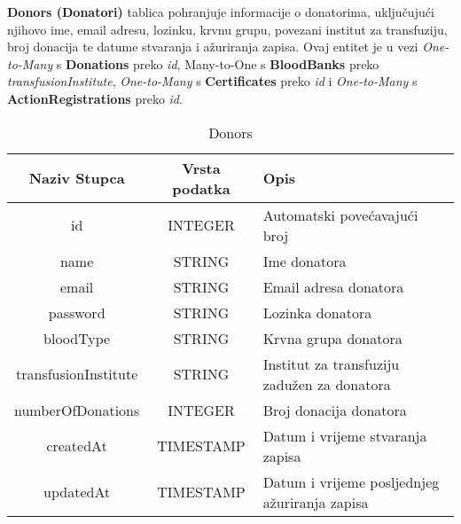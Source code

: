 				\noindent\textbf{Donors (Donatori)} tablica pohranjuje informacije o donatorima, uključujući njihovo ime, email adresu, lozinku, krvnu grupu, povezani institut za transfuziju, broj donacija te datume stvaranja i ažuriranja zapisa. Ovaj entitet je u vezi \textit{One-to-Many} s \textbf{Donations} preko \textit{id},  {Many-to-One} s \textbf{BloodBanks} preko \textit{transfusionInstitute}, \textit{One-to-Many} s \textbf{Certificates} preko \textit{id} i \textit{One-to-Many} s \textbf{ActionRegistrations} preko \textit{id}.
				\begin{table}[H]
				    \renewcommand{\arraystretch}{2}
				    \centering
				     \begin{tabularx}{1\textwidth}{|c|c|X|}
				    \hline
				    \textbf{Naziv Stupca} & \textbf{Vrsta podatka} & \textbf{Opis} \\
				    \hline
				    \cellcolor{LightGreen} id & INTEGER & Automatski povećavajući broj\\
				    \hline
				    name & STRING & Ime donatora \\
				    \hline 
				     email & STRING & Email adresa donatora \\ 
				    \hline
				    password & STRING & Lozinka donatora \\
				    \hline
				    bloodType & STRING & Krvna grupa donatora \\
				    \hline
				    \cellcolor{LightBlue} transfusionInstitute & STRING & Institut za transfuziju zadužen za donatora\\
				    \hline
				    numberOfDonations & INTEGER & Broj donacija donatora \\
				    \hline
				    createdAt & TIMESTAMP & Datum i vrijeme stvaranja zapisa \\
				    \hline
				    updatedAt & TIMESTAMP & Datum i vrijeme posljednjeg ažuriranja zapisa \\
				    \hline
				    \end{tabularx}
				    \caption{Donors}
				    \label{tab:my_label}
				\end{table}
				\clearpage %
				
